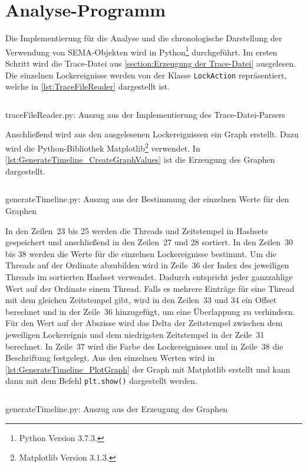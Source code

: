 \section{Analyse-Programm}
\label{section:Implementierung:Analyse-Programm}
Die Implementierung für die Analyse und die chronologische Darstellung der
Verwendung von \textrm{SEMA}-Objekten wird in Python\footnote{Python Version
3.7.3.} durchgeführt. Im ersten Schritt wird die Trace-Datei aus
\cref{section:Erzeugung der Trace-Datei} ausgelesen. Die einzelnen
Lockereignisse werden von der Klasse
\texttt{Lock\-Action} repräsentiert, welche in \cref{lst:TraceFileReader}
dargestellt ist.
\begin{listing}[ht]
  \inputminted[frame=lines,linenos,firstline=1,lastline=10]{python}{./Python/traceFileReader.py}
  \caption{traceFileReader.py: Auszug aus der Implementierung des Trace-Datei-Parsers}
  \label{lst:TraceFileReader}
\end{listing}

Anschließend wird aus den ausgelesenen Lockereignissen ein Graph erstellt. Dazu
wird die Python-Bibliothek Matplotlib\footnote{Matplotlib Version 3.1.3.}
verwendet. In \cref{lst:GenerateTimeline_CreateGraphValues} ist die Erzeugung
des Graphen dargestellt.
\begin{listing}[ht]
  \inputminted[frame=lines,linenos,firstline=16,lastline=38]{python}{./Python/generateTimeline.py}
  \caption{generateTimeline.py: Auszug aus der Bestimmung der einzelnen Werte für den Graphen}
  \label{lst:GenerateTimeline_CreateGraphValues}
\end{listing}
In den Zeilen~23 bis 25 werden die Threads und Zeitstempel in Hashsets
gespeichert und anschließend in den Zeilen~27 und 28 sortiert. In den Zeilen~30
bis 38 werden die Werte für die einzelnen Lockereignisse bestimmt. Um die
Threads auf der Ordinate abzubilden wird in Zeile~36 der Index des jeweiligen
Threads im sortierten Hashset verwendet. Dadurch entspricht jeder ganzzahlige
Wert auf der Ordinate einem Thread. Falls es mehrere Einträge für eine Thread
mit dem gleichen Zeitstempel gibt, wird in den Zeilen~33 und 34 ein Offset
berechnet und in der Zeile~36 hinzugefügt, um eine Überlappung zu verhindern.
Für den Wert auf der Abszisse wird das Delta der Zeitstempel zwischen dem
jeweiligen Lockereignis und dem niedrigsten Zeitstempel in der Zeile~31
berechnet. In Zeile~37 wird die Farbe des Lockereignisses und in Zeile~38 die
Beschriftung festgelegt. Aus den einzelnen Werten wird in
\cref{lst:GenerateTimeline_PlotGraph} der Graph mit Matplotlib erstellt und kann
dann mit dem Befehl \texttt{plt.show()} dargestellt werden.
\begin{listing}[ht]
  \inputminted[frame=lines,linenos,firstline=42,lastline=44]{python}{./Python/generateTimeline.py}
  \caption{generateTimeline.py: Auszug aus der Erzeugung des Graphen}
  \label{lst:GenerateTimeline_PlotGraph}
\end{listing}

